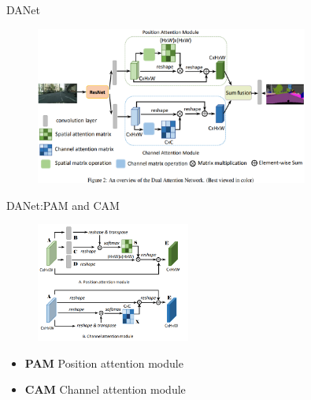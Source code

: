 \begin{frame}{DANet}
    \begin{figure}
        \centering
        \includegraphics[width=0.8\textwidth]{docs/paperReading/danet/danet.png}
    \end{figure}
\end{frame}

\begin{frame}{DANet:PAM and CAM}
    \begin{figure}
        \centering
        \includegraphics[width=0.45\textwidth]{docs/paperReading/danet/pam_cam.png}
    \end{figure}

    \begin{itemize}
        \item \textbf{PAM} Position attention module
        \item \textbf{CAM} Channel attention module
    \end{itemize}
\end{frame}


